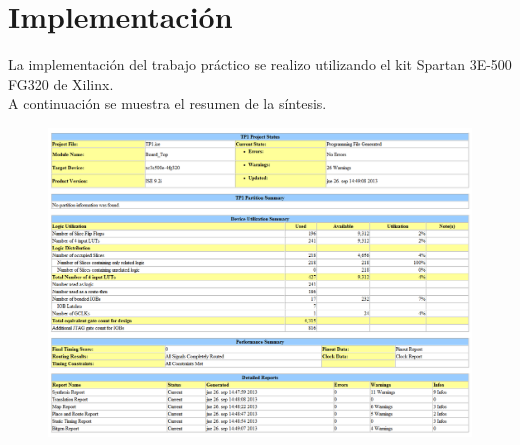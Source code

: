 \documentclass[a4paper,10pt]{article}
\begin{document}
\section{Implementación}
La implementación del trabajo práctico se realizo utilizando el kit Spartan 3E-500 FG320 de Xilinx.  \\
A continuación se muestra el resumen de la síntesis.
 \begin{figure}[H]
		\centering
		\includegraphics[scale=0.5]{reporte.png}
	\end{figure}
\end{document}
